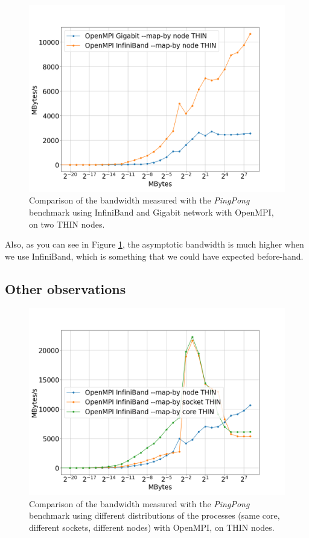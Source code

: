 \documentclass{article}
\begin{document}
\begin{figure}[t]
    \centering
    \includegraphics[width=\textwidth]{benchmark/infi_vs_giga_node_bandw.png}
    \caption{Comparison of the bandwidth measured with the \emph{PingPong} benchmark using InfiniBand and Gigabit network with OpenMPI, on two THIN nodes.}
    \label{fig:infi_vs_giga_bandwidth}
\end{figure}

Also, as you can see in Figure \ref{fig:infi_vs_giga_bandwidth}, the asymptotic bandwidth is much higher when we use InfiniBand, which is something that we could have expected before-hand.

\subsection{Other observations}
\begin{figure}[t]
    \centering
    \includegraphics[width=\textwidth]{benchmark/mapby_bandwidth.png}
    \caption{Comparison of the bandwidth measured with the \emph{PingPong} benchmark using different distributions of the processes (same core, different sockets, different nodes) with OpenMPI, on THIN nodes.}
    \label{fig:mapby}
\end{figure}
\end{document}
